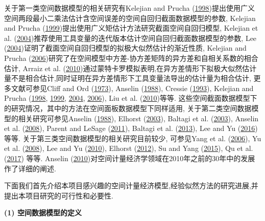 \documentclass[cs4size]{article}
\def\link{\hyperlink}
\begin{document}
关于第一类空间数据模型的相关研究有Kelejian and Prucha (\link{Kelejian and Prucha 1998}{1998})提出使用广义空间两段最小二乘法估计含空间误差的空间自回归截面数据模型的参数, Kelejian and Prucha (\link{Kelejian and Prucha 1999}{1999})提出使用广义矩估计方法研究截面空间自回归模型, Kelejian et al. (\link{Kelejian et al. 2004}{2004})推荐使用工具变量的迭代版本估计空间自回归截面数据模型的参数, Lee (\link{Lee 2004}{2004})证明了截面空间自回归模型的拟极大似然估计的渐近性质, Kelejian and Prucha (\link{Kelejian and Prucha 2006}{2006})研究了在空间模型中方差-协方差矩阵的异方差和自相关系数的相合估计, Arraiz et al. (\link{Arraiz et al. 2010}{2010})通过蒙特卡罗模拟表明,在异方差情形下拟极大似然估计量不是相合估计,同时证明在异方差情形下工具变量法导出的估计量为相合估计, 更多文献可参见Cliff and Ord (\link{Cliff and Ord 1973}{1973}), Anselin (\link{Anselin 1988}{1988}), Cressie (\link{Cressie 1993}{1993}), Kelejian and Prucha (\link{Kelejian and Prucha 1998}{1998}, \link{Kelejian and Prucha 1999}{1999}, \link{Kelejian et al. 2004}{2004}, \link{Kelejian and Prucha 2006}{2006}), Liu et al. (\link{Liu et al. 2010}{2010})等等. 这些空间截面数据模型下的研究情况，其中的方法在空间面板数据模型下同样适用, 关于第二类空间数据模型的相关研究可参见Anselin (\link{Anselin 1988}{1988}), Elhorst (\link{Elhorst 2003}{2003}), Baltagi et al. (\link{Baltagi et al. 2003}{2003}), Anselin et al. (\link{Anselin et al. 2008}{2008}), Parent and LeSage (\link{Parent and LeSage 2011}{2011}), Baltagi et al. (\link{Baltagi et al. 2013}{2013}), Lee and Yu (\link{Lee and Yu 2016}{2016})等等. 关于第三类空间数据模型的相关研究目前较少, 可参见Yang et al. (\link{Yang et al. 2006}{2006}), Yu et al. (\link{Yu et al. 2008}{2008}), Lee and Yu (\link{Lee and Yu 2010}{2010}), Elhorst (\link{Elhorst 2012}{2012}), Su and Yang (\link{Su and Yang 2015}{2015}), Qu et al. (\link{Qu et al. 2017}{2017}) 等等. Anselin (\link{Anselin 2010}{2010})对空间计量经济学领域在2010年之前的30年中的发展作了详细的阐述. 

下面我们首先介绍本项目感兴趣的空间计量经济模型,经验似然方法的研究进展,并提出本项目研究的可行性和必要性.  

{\bf (1) 空间数据模型的定义}
\end{document}
